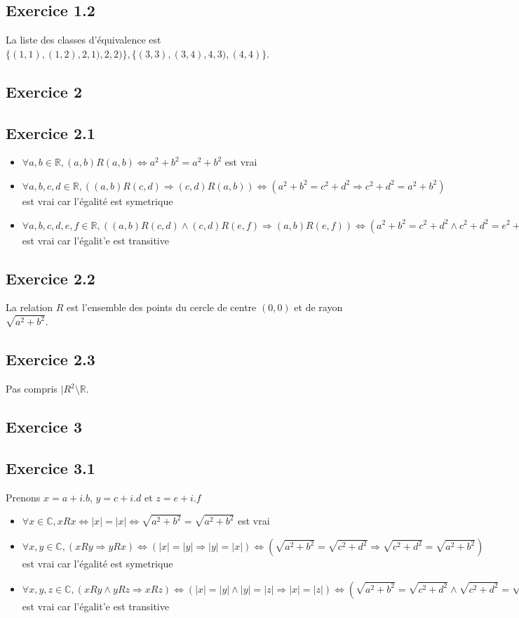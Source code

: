 \documentclass[]{book}
\theoremstyle{definition}
\newcommand{\bb}[1]{\mathbb{#1}}
\newcommand{\R}{\bb{R}}
\newcommand{\C}{\bb{C}}
\begin{document}
\subsection*{Exercice 1.2}
La liste des classes d'\'equivalence est $\{(1,1),(1,2),2,1),2,2)\}, \{(3,3),(3,4),4,3),(4,4)\}$.


\subsection*{Exercice 2}
\subsection*{Exercice 2.1}
\begin{itemize}
\item $\forall a,b \in \R, (a,b)R(a,b) \Leftrightarrow a^2+b^2 = a^2 + b^2$ est vrai
\item $\forall a,b,c,d \in \R, ((a,b)R(c,d) \Rightarrow (c,d)R(a,b)) \Leftrightarrow (a^2+b^2 = c^2 + d^2 \Rightarrow c^2 + d^2 = a^2+b^2)$ est vrai car l'\'egalit\'e est symetrique
\item $\forall a,b,c,d,e,f \in \R, ((a,b)R(c,d) \wedge (c,d)R(e,f) \Rightarrow (a,b)R(e,f)) \Leftrightarrow (a^2+b^2 = c^2 + d^2 \wedge c^2 + d^2 = e^2+f^2\Rightarrow a^2 + b^2 = e^2+f^2)$ est vrai car l'\'egalit'e est transitive
\end{itemize}

\subsection*{Exercice 2.2}
La relation $R$ est l'ensemble des points du cercle de centre $(0,0)$ et de rayon $\sqrt{a^2+b^2}$.

\subsection*{Exercice 2.3}
Pas compris $|R^2\setminus\R$.


\subsection*{Exercice 3}
\subsection*{Exercice 3.1}
Prenons $x=a+i.b$, $y=c+i.d $ et $z=e+i.f$
\begin{itemize}
\item $\forall x \in \C, xRx \Leftrightarrow |x| = |x| \Leftrightarrow \sqrt{a^2+b^2} = \sqrt{a^2+b^2} $  est vrai
\item $\forall x,y \in \C, (xRy \Rightarrow yRx) \Leftrightarrow (|x| = |y| \Rightarrow |y| = |x|) \Leftrightarrow (\sqrt{a^2+b^2} = \sqrt{c^2+d^2} \Rightarrow \sqrt{c^2+d^2} = \sqrt{a^2+b^2})$ est vrai car l'\'egalit\'e est symetrique
\item $\forall x,y,z \in \C, (xRy \wedge yRz \Rightarrow xRz) \Leftrightarrow (|x| = |y| \wedge |y| = |z| \Rightarrow |x| = |z|) \Leftrightarrow (\sqrt{a^2+b^2} = \sqrt{c^2+d^2} \wedge \sqrt{c^2+d^2} = \sqrt{e^2+f^2} \Rightarrow \sqrt{a^2+b^2} = \sqrt{e^2+f^2})$ est vrai car l'\'egalit'e est transitive
\end{itemize}
\end{document}
